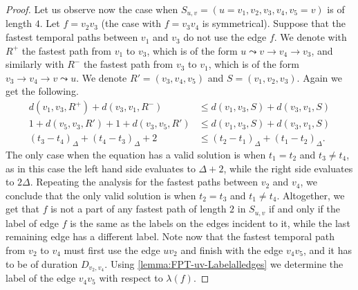 \documentclass[a4paper,UKenglish,cleveref, autoref, thm-restate]{lipics-v2021}
\begin{document}
\begin{proof}
    Let us observe now the case when $S_{u,v} = (u=v_1,v_2, v_3, v_4, v_5=v)$ is of length $4$.
    Let $f = v_2 v_3$ (the case with $f = v_3 v_4$ is symmetrical).
    Suppose that the fastest temporal paths between $v_1$ and $v_3$ do not use the edge $f$.
    We denote with $R^+$ the fastest path from $v_1$ to $v_3$, 
    which is of the form $u \leadsto v \rightarrow v_4 \rightarrow v_3$,
    and similarly 
    with $R^-$ the fastest path from $v_3$ to $v_1$, which is
    of the form $v_3 \rightarrow v_4 \rightarrow v \leadsto u$.
    We denote $R' = (v_3, v_4, v_5)$ and $S = (v_1,v_2,v_3)$.
    Again we get the following.
    \begin{equation*}
    \begin{split}
        d(v_{1}, v_{3}, R^+) + d(v_{3}, v_{1}, R^-) &\leq 
        d(v_{1}, v_{3}, S) + d(v_{3}, v_{1}, S) \\
        1 + d(v_5,v_3,R') + 1 + d(v_3,v_5,R') &\leq d(v_{1}, v_{3}, S) + d(v_{3}, v_{1}, S) \\
        (t_3 - t_4)_\Delta + (t_4 - t_3)_\Delta + 2 
        &\leq 
        (t_2 - t_1)_\Delta + (t_1 - t_2)_\Delta.        
    \end{split}
    \end{equation*}
    The only case when the equation has a valid solution is when $t_1 = t_2$ and $t_3 \neq t_4$,
    as in this case the left hand side evaluates to $\Delta + 2$, while the right side evaluates to $2 \Delta$.
    Repeating the analysis for the fastest paths between $v_2$ and $v_4$,
    we conclude that the only valid solution is when $t_2 = t_3$ and $t_1 \neq t_4$.
    Altogether, we get that $f$ is not a part of any fastest path of length $2$ in $S_{u,v}$ if and only if the label of edge $f$ is the same as the labels on the edges incident to it, while the last remaining edge has a different label.
    Note now that the fastest temporal path from $v_2$ to $v_4$ must first use the edge $u v_2$ and finish with the edge $v_4 v_5$, and it has to be of duration $D_{v_2, v_4}$. Using \cref{lemma:FPT-uv-Labelalledges} we determine the label of the edge $v_4v_5$ with respect to $\lambda(f)$.
\end{proof}
\end{document}
